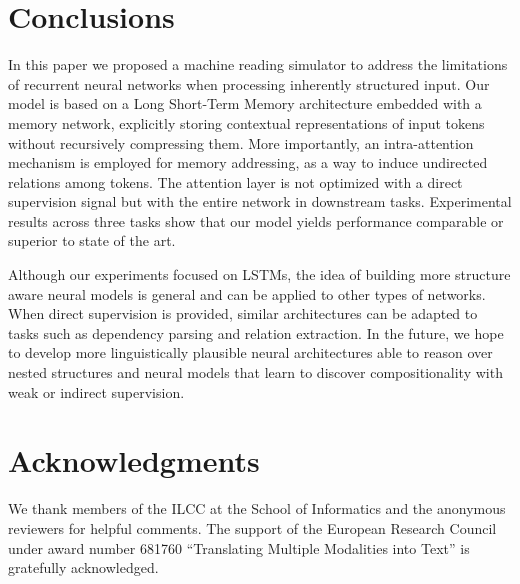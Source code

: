 \documentclass[11pt,letterpaper]{article}
\begin{document}
	
	\section{Conclusions}
	\label{sec:conclusions}
	
	In this paper we proposed a machine reading simulator to
        address the limitations of recurrent neural networks when
        processing inherently structured input.  Our model is based on
        a Long Short-Term Memory architecture embedded with a memory
        network, explicitly storing contextual representations of
        input tokens without recursively compressing them.  More
        importantly, an intra-attention mechanism is employed for
        memory addressing, as a way to induce undirected relations
        among tokens. The attention layer is not optimized with a
        direct supervision signal but with the entire network in
        downstream tasks.  Experimental results across three tasks
        show that our model yields performance comparable or superior
        to state of the art.
	
	Although our experiments focused on LSTMs, the idea of
        building more structure aware neural models is general and can
        be applied to other types of networks. When direct supervision
        is provided, similar architectures can be adapted to tasks
        such as dependency parsing and relation extraction. In the
        future, we hope to develop more linguistically plausible
        neural architectures able to reason over nested structures and
        neural models that learn to discover compositionality with
        weak or indirect supervision.
	
	\section*{Acknowledgments}
        We thank members of the ILCC at the School of Informatics and
        the anonymous reviewers for helpful comments. The support of
        the European Research Council under award number 681760
        ``Translating Multiple Modalities into Text'' is gratefully
        acknowledged.

	
	
	
\end{document}
